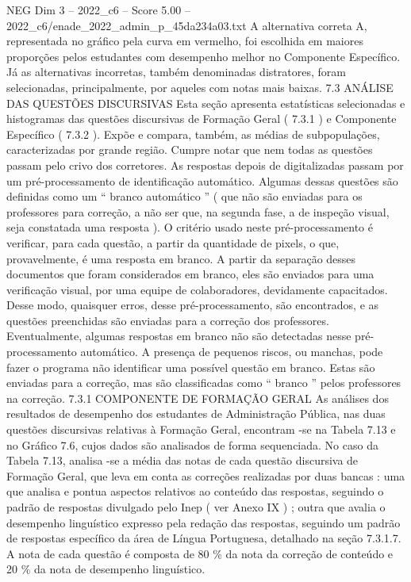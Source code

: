 \begin{textsample}{NEG Dim 3 – 2022\_c6 – Score 5.00 – 2022\_c6/enade\_2022\_admin\_p\_45da234a03.txt}
A alternativa correta A, representada no gráfico pela curva em vermelho, foi escolhida em maiores proporções pelos estudantes com desempenho melhor no Componente Específico.
Já as alternativas incorretas, também denominadas distratores, foram selecionadas, principalmente, por aqueles com notas mais baixas. 7.3 ANÁLISE DAS QUESTÕES DISCURSIVAS Esta seção apresenta estatísticas selecionadas e histogramas das questões discursivas de Formação Geral ( 7.3.1 ) e Componente Específico ( 7.3.2 ).
Expõe e compara, também, as médias de subpopulações, caracterizadas por grande região.
Cumpre notar que nem todas as questões passam pelo crivo dos corretores.
As respostas depois de digitalizadas passam por um pré-processamento de identificação automático.
Algumas dessas questões são definidas como um “ branco automático ” ( que não são enviadas para os professores para correção, a não ser que, na segunda fase, a de inspeção visual, seja constatada uma resposta ).
O critério usado neste pré-processamento é verificar, para cada questão, a partir da quantidade de pixels, o que, provavelmente, é uma resposta em branco.
A partir da separação desses documentos que foram considerados em branco, eles são enviados para uma verificação visual, por uma equipe de colaboradores, devidamente capacitados.
Desse modo, quaisquer erros, desse pré-processamento, são encontrados, e as questões preenchidas são enviadas para a correção dos professores.
Eventualmente, algumas respostas em branco não são detectadas nesse pré-processamento automático.
A presença de pequenos riscos, ou manchas, pode fazer o programa não identificar uma possível questão em branco.
Estas são enviadas para a correção, mas são classificadas como “ branco ” pelos professores na correção. 7.3.1 COMPONENTE DE FORMAÇÃO GERAL As análises dos resultados de desempenho dos estudantes de Administração Pública, nas duas questões discursivas relativas à Formação Geral, encontram -se na Tabela 7.13 e no Gráfico 7.6, cujos dados são analisados de forma sequenciada.
No caso da Tabela 7.13, analisa -se a média das notas de cada questão discursiva de Formação Geral, que leva em conta as correções realizadas por duas bancas : uma que analisa e pontua aspectos relativos ao conteúdo das respostas, seguindo o padrão de respostas divulgado pelo Inep ( ver Anexo IX ) ; outra que avalia o desempenho linguístico expresso pela redação das respostas, seguindo um padrão de respostas específico da área de Língua Portuguesa, detalhado na seção 7.3.1.7.
A nota de cada questão é composta de 80 \% da nota da correção de conteúdo e 20 \% da nota de desempenho linguístico.

\end{textsample}

